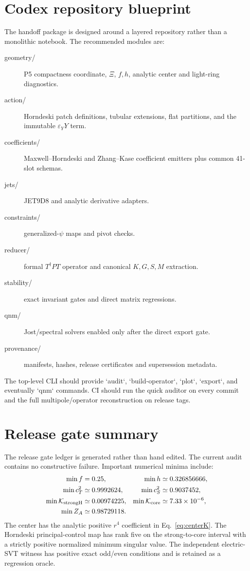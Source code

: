 \documentclass[11pt,a4paper,oneside]{book}
\newcommand{\epsY}{\varepsilon_Y}
\begin{document}
\chapter{Codex repository blueprint}
The handoff package is designed around a layered repository rather than a monolithic notebook. The recommended modules are:
\begin{description}
\item[geometry/] P5 compactness coordinate, $\Xi$, $f,h$, analytic center and light-ring diagnostics.
\item[action/] Horndeski patch definitions, tubular extensions, flat partitions, and the immutable $\epsY Y$ term.
\item[coefficients/] Maxwell--Horndeski and Zhang--Kase coefficient emitters plus common 41-slot schemas.
\item[jets/] JET9D8 and analytic derivative adapters.
\item[constraints/] generalized-$\psi$ maps and pivot checks.
\item[reducer/] formal $T^\dagger P T$ operator and canonical $K,G,S,M$ extraction.
\item[stability/] exact invariant gates and direct matrix regressions.
\item[qnm/] Jost/spectral solvers enabled only after the direct export gate.
\item[provenance/] manifests, hashes, release certificates and supersession metadata.
\end{description}

The top-level CLI should provide `audit`, `build-operator`, `plot`, `export`, and eventually `qnm` commands. CI should run the quick auditor on every commit and the full multipole/operator reconstruction on release tags.

\chapter{Release gate summary}
The release gate ledger is generated rather than hand edited. The current audit contains no constructive failure. Important numerical minima include:
\begin{align}
 \min f&=0.25, & \min h&\simeq0.326856666,\\
 \min c_T^2&\simeq0.9992624, & \min c_S^2&\simeq0.9037452,\\
 \min \mathcal K_{\rm strongH}&\simeq0.00974225, & \min \mathcal K_{\rm core}&\simeq7.33\times10^{-6},\\
 \min Z_A&\simeq0.98729118.&&
\end{align}
The center has the analytic positive $r^4$ coefficient in Eq.~\eqref{eq:centerK}. The Horndeski principal-control map has rank five on the strong-to-core interval with a strictly positive normalized minimum singular value. The independent electric-SVT witness has positive exact odd/even conditions and is retained as a regression oracle.
\end{document}
